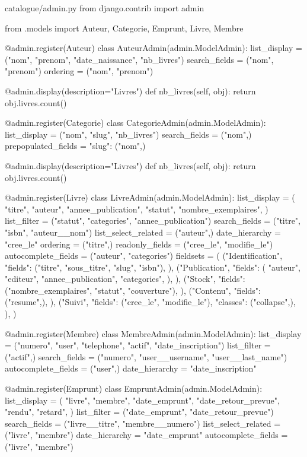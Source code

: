 \begin{codebox}[python]{catalogue/admin.py}
from django.contrib import admin

from .models import Auteur, Categorie, Emprunt, Livre, Membre


@admin.register(Auteur)
class AuteurAdmin(admin.ModelAdmin):
    list_display = ("nom", "prenom", "date_naissance", "nb_livres")
    search_fields = ("nom", "prenom")
    ordering = ("nom", "prenom")

    @admin.display(description="Livres")
    def nb_livres(self, obj):
        return obj.livres.count()


@admin.register(Categorie)
class CategorieAdmin(admin.ModelAdmin):
    list_display = ("nom", "slug", "nb_livres")
    search_fields = ("nom",)
    prepopulated_fields = {"slug": ("nom",)}

    @admin.display(description="Livres")
    def nb_livres(self, obj):
        return obj.livres.count()


@admin.register(Livre)
class LivreAdmin(admin.ModelAdmin):
    list_display = (
        "titre",
        "auteur",
        "annee_publication",
        "statut",
        "nombre_exemplaires",
    )
    list_filter = ("statut", "categories", "annee_publication")
    search_fields = ("titre", "isbn", "auteur__nom")
    list_select_related = ("auteur",)
    date_hierarchy = "cree_le"
    ordering = ("titre",)
    readonly_fields = ("cree_le", "modifie_le")
    autocomplete_fields = ("auteur", "categories")
    fieldsets = (
        ("Identification", {
            "fields": ("titre", "sous_titre", "slug", "isbn"),
        }),
        ("Publication", {
            "fields": (
                "auteur",
                "editeur",
                "annee_publication",
                "categories",
            ),
        }),
        ("Stock", {
            "fields": ("nombre_exemplaires", "statut", "couverture"),
        }),
        ("Contenu", {
            "fields": ("resume",),
        }),
        ("Suivi", {
            "fields": ("cree_le", "modifie_le"),
            "classes": ("collapse",),
        }),
    )


@admin.register(Membre)
class MembreAdmin(admin.ModelAdmin):
    list_display = ("numero", "user", "telephone", "actif", "date_inscription")
    list_filter = ("actif",)
    search_fields = ("numero", "user__username", "user__last_name")
    autocomplete_fields = ("user",)
    date_hierarchy = "date_inscription"


@admin.register(Emprunt)
class EmpruntAdmin(admin.ModelAdmin):
    list_display = (
        "livre",
        "membre",
        "date_emprunt",
        "date_retour_prevue",
        "rendu",
        "retard",
    )
    list_filter = ("date_emprunt", "date_retour_prevue")
    search_fields = ("livre__titre", "membre__numero")
    list_select_related = ("livre", "membre")
    date_hierarchy = "date_emprunt"
    autocomplete_fields = ("livre", "membre")


\end{codebox}
